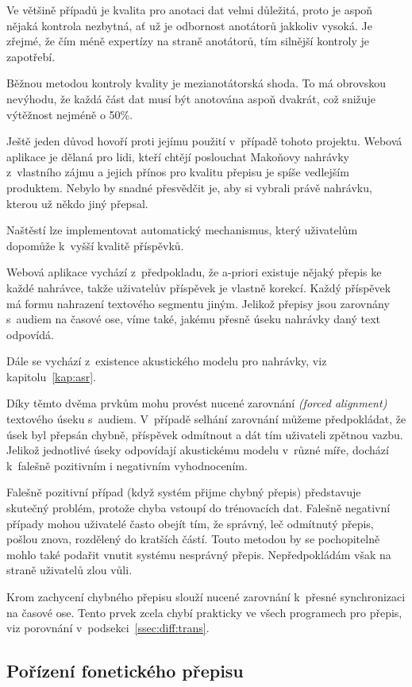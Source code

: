 Ve většině případů je kvalita pro anotaci dat velmi důležitá, proto je aspoň
nějaká kontrola nezbytná, ať už je odbornost anotátorů jakkoliv vysoká. Je
zřejmé, že čím méně expertízy na straně anotátorů, tím silnější kontroly je
zapotřebí.

Běžnou metodou kontroly kvality je mezianotátorská shoda. To má obrovskou
nevýhodu, že každá část dat musí být anotována aspoň dvakrát, což snižuje
výtěžnost nejméně o 50\%.

Ještě jeden důvod hovoří proti jejímu použití v~případě tohoto projektu. Webová
aplikace je dělaná pro lidi, kteří chtějí poslouchat Makoňovy nahrávky
z~vlastního zájmu a jejich přínos pro kvalitu přepisu je spíše vedlejším
produktem. Nebylo by snadné přesvědčit je, aby si vybrali právě nahrávku, kterou
už někdo jiný přepsal.

Naštěstí lze implementovat automatický mechanismus, který uživatelům dopomůže
k~vyšší kvalitě příspěvků.

Webová aplikace vychází z~předpokladu, že a-priori existuje nějaký přepis ke
každé nahrávce, takže uživatelův příspěvek je vlastně korekcí. Každý příspěvek
má formu nahrazení textového segmentu jiným. Jelikož přepisy jsou zarovnány
s~audiem na časové ose, víme také, jakému přesně úseku nahrávky daný text
odpovídá.

Dále se vychází z~existence akustického modelu pro nahrávky, viz kapitolu~\ref{kap:asr}.

Díky těmto dvěma prvkům mohu provést nucené zarovnání {\em (forced alignment)} textového úseku
s~audiem. V~případě selhání zarovnání můžeme předpokládat, že úsek byl přepsán
chybně, příspěvek odmítnout a dát tím uživateli zpětnou vazbu. Jelikož
jednotlivé úseky odpovídají akustickému modelu v~různé míře, dochází k~falešně
pozitivním i negativním vyhodnocením.

Falešně pozitivní případ (když systém přijme chybný přepis) představuje skutečný
problém, protože chyba vstoupí do trénovacích dat. Falešně negativní případy
mohou uživatelé často obejít tím, že správný, leč odmítnutý přepis, pošlou
znova, rozdělený do kratších částí. Touto metodou by se pochopitelně mohlo také
podařit vnutit systému nesprávný přepis. Nepředpokládám však na straně uživatelů
zlou vůli.

Krom zachycení chybného přepisu slouží nucené zarovnání k~přesné synchronizaci
na časové ose. Tento prvek zcela chybí prakticky ve všech programech pro přepis,
viz porovnání v~podsekci~\ref{ssec:diff:trans}.

\subsection{Pořízení fonetického přepisu}
\label{ssec:porizeni-fonetickeho-prepisu}

